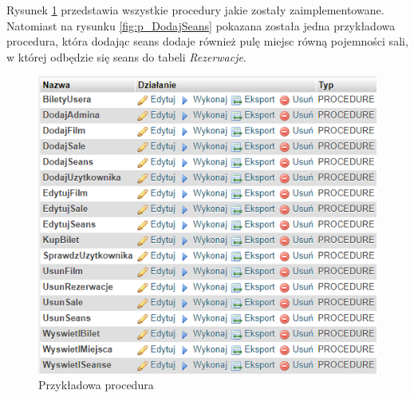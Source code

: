 Rysunek \ref{fig:procedury} przedstawia wszystkie procedury jakie zostały zaimplementowane. Natomiast na rysunku \ref{fig:p_DodajSeans} pokazana została jedna przykładowa procedura, która dodając seans dodaje również pulę miejsc równą pojemności sali, w której odbędzie się seans do tabeli \textit{Rezerwacje}.
\begin{figure} [H]
	\centering
	\includegraphics[width=0.7\linewidth]{rozdzial04/Procedury.png}
	\caption{Przykładowa procedura}
	\label{fig:procedury}
\end{figure}

